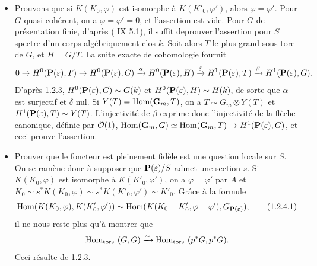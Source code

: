 \documentclass[10pt]{../fichiers-configuration-latex/smfart}
\begin{document}
\begin{itemize} 
\item[A.] Prouvons que si $K(K_{0},\varphi)$ est isomorphe à
$K(K'_0,\varphi')$, alors $\varphi=\varphi'$. Pour $G$
quasi-cohérent, on a $\varphi=\varphi'=0$, et l'assertion est
vide. Pour $G$ de présentation finie, d'après ( IX 5.1), il
suffit de\pageoriginale prouver l'assertion pour $S$ spectre d'un
corps algébriquement clos $k$. Soit alors $T$ le plus grand sous-tore
de $G$, et $H=G/T$. La suite exacte de cohomologie fournit
$$
0\rightarrow H^{0}(\mathbf{P}(\varepsilon),T)\rightarrow
H^{0}(\mathbf{P}(\varepsilon),G) \xrightarrow{\alpha}
H^{0}(\mathbf{P}(\varepsilon),H)
 \xrightarrow{\delta}
H^{1}(\mathbf{P}(\varepsilon),T)\xrightarrow{\beta}H^{1}(\mathbf{P}(\varepsilon),G){}.
$$
D'après \hyperref[XVIII.lem1.2.3]{1.2.3}, $H^0(\mathbf{P}(\varepsilon),G)\sim G(k)$ et
$H^0(\mathbf{P}(\varepsilon),H)\sim H(k)$, de sorte que $\alpha$
est surjectif et $\delta$ nul. Si $Y(T)=\operatorname{Hom}(\mathbf{G}_{m},T)$, on a
$T\sim G_{m}\otimes Y(T)$ et $H^{1}(\mathbf{P}(\varepsilon),T)\sim
Y(T)$. L'injectivité de $\beta$ exprime donc l'injectivité de la
flèche canonique, définie par ${\mathcal O}(1)$,
$\operatorname{Hom}(\mathbf{G}_{m},G)\simeq \operatorname{Hom}(\mathbf{G}_{m},T)\rightarrow
H^{1}(\mathbf{P}(\varepsilon),G)$, et ceci prouve l'assertion.

\item[B.] Prouver que le foncteur  est pleinement fidèle est
  une question locale sur $S$. On se ramène donc à supposer que
  $\mathbf{P}(\varepsilon)/S$ admet une section $s$.
  Si $K(K_{0},\varphi)$
  est isomorphe à $K(K'_{0},\varphi')$, on a $\varphi=\varphi'$ par
  $A$ et $K_{0}\sim s^{\ast}K(K_{0},\varphi)\sim
  s^{\ast}K(K'_{0},\varphi')\sim K'_{0}$. Grâce à la formule
\begin{equation*}
\operatorname{Hom} (K(K_{0},\varphi), K(K'_{0},\varphi'))\sim \operatorname{Hom}(K(K_{0}-K'_{0},\varphi-\varphi'),G_{\mathbf{P}(\varepsilon)}){},\tag{1.2.4.1}
\end{equation*}%
il ne nous reste plus qu'à montrer que
$$
\operatorname{Hom}_{\operatorname{tors}.}(G,G)\xrightarrow{\sim}
\operatorname{Hom}_{\operatorname{tors}.}(p^{\ast}G,p^{\ast}G){}.
$$
Ceci résulte de \hyperref[XVIII.lem1.2.3]{1.2.3}.
\end{itemize}

\setcounter{subsubsection}{4}
\subsubsection{}
\end{document}

